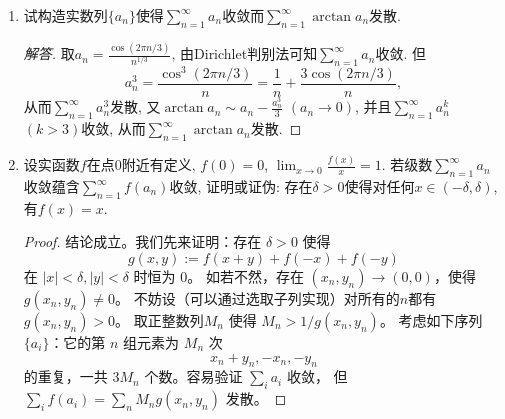 \begin{6b}
\begin{enumerate}
\begin{proof}[解答]
\end{proof}
\item 试构造实数列\(\{a_n\}\)使得\(\sum_{n=1}^{\infty}a_n\)收敛而\(\sum_{n=1}^{\infty}\arctan a_n\)发散.
\begin{proof}[解答]
	取\(a_n=\frac{\cos(2\pi n/3)}{n^{1/3}}\), 
    由Dirichlet判别法可知\(\sum_{n=1}^{\infty}a_n\)收敛. 但
    \[a_n^3=\frac{\cos^3(2\pi n/3)}{n}=\frac{1}{n}+\frac{3\cos(2\pi n/3)}{n},\]
    从而\(\sum_{n=1}^{\infty}a_n^3\)发散, 
    又\(\arctan a_n\sim a_n-\frac{a_n^3}{3}\) \((a_n\rightarrow 0)\), 
    并且\(\sum_{n=1}^{\infty}a_n^k\) \((k>3)\)收敛, 
    从而\(\sum_{n=1}^{\infty}\arctan a_n\)发散.
\end{proof}
\item 设实函数\(f\)在点\(0\)附近有定义, \(f(0)=0\), \(\lim_{x\rightarrow 0}\frac{f(x)}{x}=1\). 
若级数\(\sum_{n=1}^{\infty}a_n\)收敛蕴含\(\sum_{n=1}^{\infty}f(a_n)\)收敛, 
证明或证伪: 存在\(\delta>0\)使得对任何\(x\in(-\delta,\delta)\), 有\(f(x)=x\).
\begin{proof}
结论成立。我们先来证明：存在 $\delta>0$ 使得
\[g(x,y):=f(x+y)+f(-x)+f(-y)\]
在 $|x|< \delta,|y|<\delta$ 时恒为 $0$。
如若不然，存在 $(x_n,y_n) \rightarrow (0,0)$，使得 $g(x_n,y_n) \neq 0$。
不妨设（可以通过选取子列实现）对所有的$n$都有$g(x_n,y_n)>0$。
取正整数列$M_n$ 使得 $M_n>1/g(x_n,y_n)$。
考虑如下序列 $\{a_i\}$：它的第 $n$ 组元素为 $M_n$ 次
$$x_n+y_n,-x_n,-y_n$$
的重复，一共 $3M_n$ 个数。容易验证 $\sum\limits_i a_i$ 收敛，
但 $\sum\limits_i f(a_i)=\sum\limits_n M_n g(x_n,y_n)$ 发散。


\end{proof}
\end{enumerate}
\end{6b}
